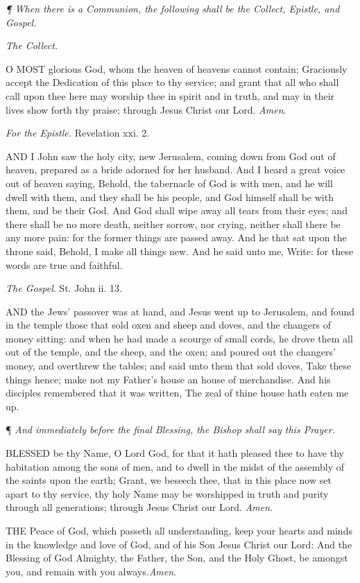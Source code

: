 \emph{¶
When there is a Communion, the following shall be the Collect, Epistle,
and Gospel.}

\emph{The
Collect.}

O
MOST glorious God, whom the heaven of heavens cannot contain; Graciously
accept the Dedication of this place to thy service; and grant that all
who shall call upon thee here may worship thee in spirit and in truth,
and may in their lives show forth thy praise; through Jesus Christ our
Lord. \emph{Amen}.

\emph{For the Epistle.} Revelation xxi. 2.

AND I John saw the holy city, new Jerusalem,
coming down from God out of heaven, prepared as a bride adorned for
her husband. And I heard a great voice out of heaven saying, Behold,
the tabernacle of God is with men, and he will dwell with them, and
they shall be his people, and God himself shall be with them, and be
their God. And God shall wipe away all tears from their eyes; and there
shall be no more death, neither sorrow, nor crying, neither shall there
be any more pain: for the former things are passed away. And he that
sat upon the throne said, Behold, I make all things new. And he said
unto me, Write: for these words are true and faithful.

\emph{The Gospel}. St. John ii. 13.

AND the Jews’ passover was at hand,
and Jesus went up to Jerusalem, and found in the temple those that sold
oxen and sheep and doves, and the changers of money sitting: and when
he had made a scourge of small cords, he drove them all out of the temple,
and the sheep, and the oxen; and poured out the changers' money, and
overthrew the tables; and said unto them that sold doves, Take these
things hence; make not my Father's house an house of merchandise. And
his disciples remembered that it was written, The zeal of thine house
hath eaten me up.

¶ \emph{And immediately before the
final Blessing, the Bishop shall say this Prayer.}

BLESSED be thy Name, O Lord God, for
that it hath pleased thee to have thy habitation among the sons of men,
and to dwell in the midst of the assembly of the saints upon the earth;
Grant, we beseech thee, that in this place now set apart to thy service,
thy holy Name may be worshipped in truth and purity through all generations;
through Jesus Christ our Lord. \emph{Amen}.

THE Peace of God, which passeth all understanding,
keep your hearts and minds in the knowledge and love of God, and of
his Son Jesus Christ our Lord: And the Blessing of God Almighty, the
Father, the Son, and the Holy Ghost, be amongst you, and remain with
you always.\emph{Amen}.

